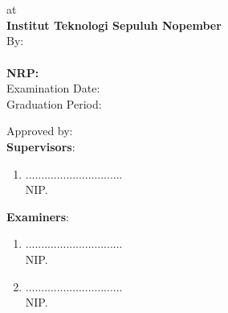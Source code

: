 { 
	\AddToShipoutPicture*{\BackgroundIm}
	\begin{center}
		\Large\textbf{\pPengesahan}
	\end{center}
	
	\begin{center}
		\tsss\\
		\vspace{1ex}
		\textbf{\ggGelar}\\
		at\\
		\textbf{Institut Teknologi Sepuluh Nopember}\\
		\vspace{1ex}
		By:\\
		\textbf{\NamaMahasiswa}\\
		\textbf{NRP: \NrpMahasiswa}\\
		\vspace{1ex}
		Examination Date: \TglUjian\\
		Graduation Period: \PerWisuda\\
		\vspace{1ex}
	\end{center}
	
	\begin{center}
		Approved by:\\
		\textbf{Supervisors}:
	\end{center}
	
	\begin{enumerate}
		\item \PbSatu \hfill ...............................\\
		NIP. \NipPbSatu \vfill
		\vfill
	\end{enumerate}	
	
	\begin{center}
		\textbf{Examiners}:
	\end{center}
	
	\begin{enumerate}
		\item \PjSatu \hfill ...............................\\
		NIP. \NipPjSatu
		\vfill
		\item \PjDua \hfill ...............................\\
		NIP. \NipPjDua \vfill
	\end{enumerate}	
	\vfill
	
}
